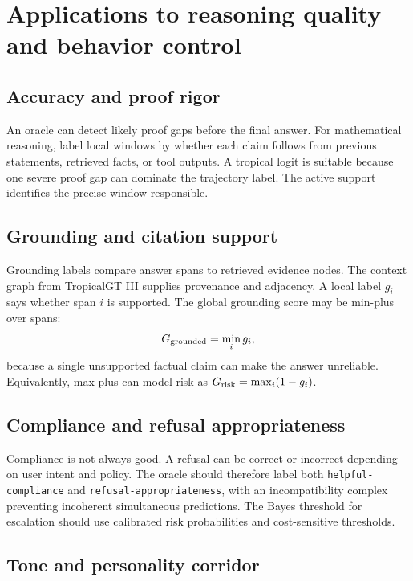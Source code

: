 \documentclass[11pt]{article}
\theoremstyle{definition}
\theoremstyle{remark}
\numberwithin{equation}{section}
\begin{document}
\section{Applications to reasoning quality and behavior control}

\subsection{Accuracy and proof rigor}

An oracle can detect likely proof gaps before the final answer.  For mathematical reasoning, label local windows by whether each claim follows from previous statements, retrieved facts, or tool outputs.  A tropical logit is suitable because one severe proof gap can dominate the trajectory label.  The active support identifies the precise window responsible.

\subsection{Grounding and citation support}

Grounding labels compare answer spans to retrieved evidence nodes.  The context graph from TropicalGT III supplies provenance and adjacency.  A local label \(g_{i}\) says whether span \(i\) is supported.  The global grounding score may be min-plus over spans:
\begin{equation}
    G_{\rm grounded}=\min_i g_i,
\end{equation}
because a single unsupported factual claim can make the answer unreliable.  Equivalently, max-plus can model risk as \(G_{\rm risk}=\max_i(1-g_i)\).

\subsection{Compliance and refusal appropriateness}

Compliance is not always good.  A refusal can be correct or incorrect depending on user intent and policy.  The oracle should therefore label both \texttt{helpful-compliance} and \texttt{refusal-appropriateness}, with an incompatibility complex preventing incoherent simultaneous predictions.  The Bayes threshold for escalation should use calibrated risk probabilities and cost-sensitive thresholds.

\subsection{Tone and personality corridor}
\end{document}
